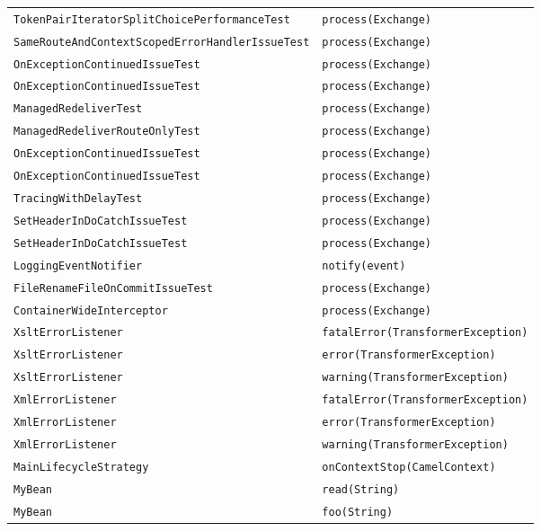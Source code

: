\begin{center}
\begin{longtable}{ll}
\lstinline/TokenPairIteratorSplitChoicePerformanceTest/&{\lstinline/process(Exchange)/}\\
\lstinline/SameRouteAndContextScopedErrorHandlerIssueTest/&{\lstinline/process(Exchange)/}\\
\lstinline/OnExceptionContinuedIssueTest/&{\lstinline/process(Exchange)/}\\
\lstinline/OnExceptionContinuedIssueTest/&{\lstinline/process(Exchange)/}\\
\lstinline/ManagedRedeliverTest/&{\lstinline/process(Exchange)/}\\
\lstinline/ManagedRedeliverRouteOnlyTest/&{\lstinline/process(Exchange)/}\\
\lstinline/OnExceptionContinuedIssueTest/&{\lstinline/process(Exchange)/}\\
\lstinline/OnExceptionContinuedIssueTest/&{\lstinline/process(Exchange)/}\\
\lstinline/TracingWithDelayTest/&{\lstinline/process(Exchange)/}\\
\lstinline/SetHeaderInDoCatchIssueTest/&{\lstinline/process(Exchange)/}\\
\lstinline/SetHeaderInDoCatchIssueTest/&{\lstinline/process(Exchange)/}\\
\lstinline/LoggingEventNotifier/&{\lstinline/notify(event)/}\\
\lstinline/FileRenameFileOnCommitIssueTest/&{\lstinline/process(Exchange)/}\\
\lstinline/ContainerWideInterceptor/&{\lstinline/process(Exchange)/}\\
\lstinline/XsltErrorListener/&{\lstinline/fatalError(TransformerException)/}\\
\lstinline/XsltErrorListener/&{\lstinline/error(TransformerException)/}\\
\lstinline/XsltErrorListener/&{\lstinline/warning(TransformerException)/}\\
\lstinline/XmlErrorListener/&{\lstinline/fatalError(TransformerException)/}\\
\lstinline/XmlErrorListener/&{\lstinline/error(TransformerException)/}\\
\lstinline/XmlErrorListener/&{\lstinline/warning(TransformerException)/}\\
\lstinline/MainLifecycleStrategy/&{\lstinline/onContextStop(CamelContext)/}\\
\lstinline/MyBean/&{\lstinline/read(String)/}\\
\lstinline/MyBean/&{\lstinline/foo(String)/}\\

\end{longtable}
\end{center}
